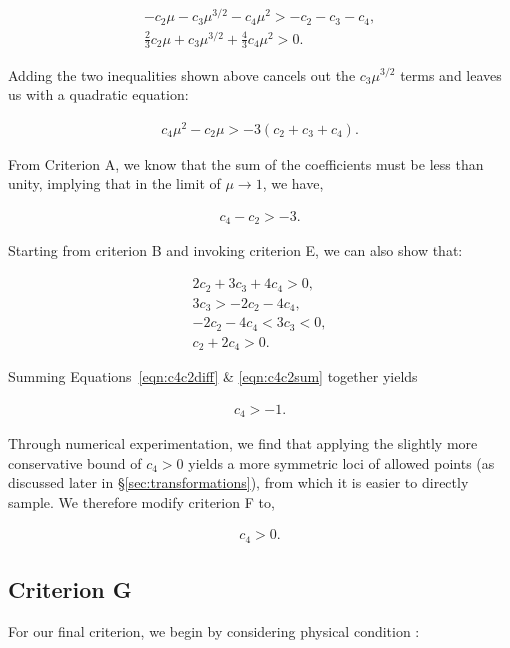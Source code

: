 \begin{align}
-c_2 \mu - c_3 \mu^{3/2} - c_4 \mu^2 > -c_2 - c_3 - c_4,\\
\frac{2}{3} c_2 \mu + c_3 \mu^{3/2} + \frac{4}{3} c_4 \mu^2 > 0.
\end{align}

Adding the two inequalities shown above cancels out the $c_3 \mu^{3/2}$ terms
and leaves us with a quadratic equation:

\begin{align}
c_4 \mu^2 - c_2 \mu > -3(c_2 + c_3 + c_4).
\end{align}

From Criterion A, we know that the sum of the coefficients must be less than 
unity, implying that in the limit of $\mu\to1$, we have,

\begin{align}
c_4 - c_2 > -3.
\label{eqn:c4c2diff}
\end{align}

Starting from criterion B and invoking criterion E, we can also show that:

\begin{align}
2c_2 + 3c_3 + 4c_4 > 0,\nonumber\\
3c_3 > -2c_2 - 4c_4,\nonumber\\
-2c_2 - 4c_4 < 3c_3 < 0,\nonumber\\
c_2 + 2c_4 > 0.
\label{eqn:c4c2sum}
\end{align}

Summing Equations~\ref{eqn:c4c2diff} \& \ref{eqn:c4c2sum} together yields

\begin{align}
c_4 > -1.
\end{align}

Through numerical experimentation, we find that applying the slightly more 
conservative bound of $c_4>0$ yields a more symmetric loci of allowed points
(as discussed later in \S\ref{sec:transformations}), from which it is easier to 
directly sample. We therefore modify criterion F to,

\begin{align}
c_4 > 0.
\label{eqn:criterionF}
\end{align}

\subsection{Criterion G}
\label{sub:criterionG}

For our final criterion, we begin by considering physical condition \II:

